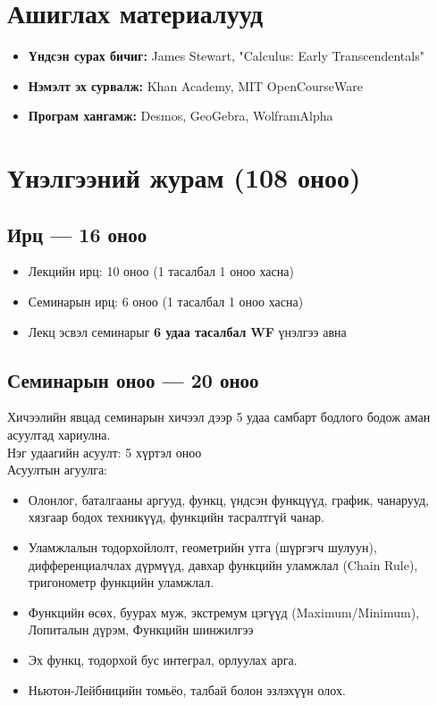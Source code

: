 \section*{Ашиглах материалууд}
\begin{itemize}[label=--]
    \item \textbf{Үндсэн сурах бичиг:} James Stewart, "Calculus: Early Transcendentals"
    \item \textbf{Нэмэлт эх сурвалж:} Khan Academy, MIT OpenCourseWare
    \item \textbf{Програм хангамж:} Desmos, GeoGebra, WolframAlpha
\end{itemize}

\newpage
\section*{Үнэлгээний журам (108 оноо)}

\subsection*{Ирц — 16 оноо}
\begin{itemize}
\item Лекцийн ирц: 10 оноо (1 тасалбал 1 оноо хасна)
\item Семинарын ирц: 6 оноо (1 тасалбал 1 оноо хасна)
\item Лекц эсвэл семинарыг \textbf{6 удаа тасалбал} \textbf{WF} үнэлгээ авна
\end{itemize}

\subsection*{Семинарын оноо  — 20 оноо}
Хичээлийн явцад семинарын хичээл дээр 5 удаа самбарт бодлого бодож  аман асуултад хариулна.\\
Нэг удаагийн асуулт: 5 хүртэл оноо\\ Асуултын агуулга:
\begin{itemize}
\item Олонлог, баталгааны аргууд, функц, үндсэн
функцүүд, график, чанарууд, хязгаар бодох
техникүүд, функцийн тасралтгүй чанар.
\item Уламжлалын тодорхойлолт, геометрийн утга
(шүргэгч шулуун), дифференциалчлах дүрмүүд, давхар функцийн уламжлал (Chain Rule),  тригонометр функцийн уламжлал.
\item Функцийн өсөх, буурах муж, экстремум цэгүүд
(Maximum/Minimum), Лопиталын дүрэм, Функцийн шинжилгээ
\item Эх функц, тодорхой бус интеграл, орлуулах арга.
\item Ньютон-Лейбницийн томьёо, талбай болон
эзлэхүүн олох.
\end{itemize}

